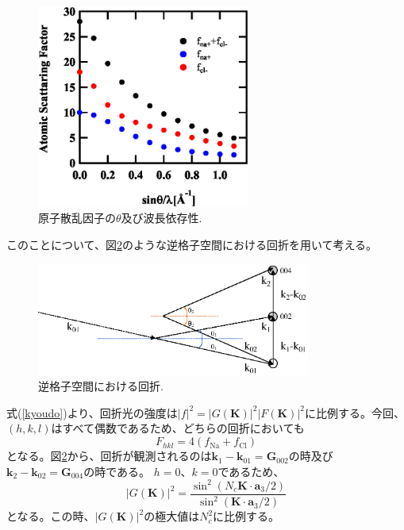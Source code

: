 \documentclass[11pt,a4j,uplatex]{jsarticle}
\begin{document}
\begin{figure}[htb]
 \centering
 \includegraphics[clip,width=7cm]{atomic.eps}
 \caption{原子散乱因子の$\theta$及び波長依存性.}
 \label{atomic}
\end{figure}


 このことについて、図\ref{laue2}のような逆格子空間における回折を用いて考える。
 \begin{figure}[htb]
  \centering
  \includegraphics[clip,width=9cm]{laue2.eps}
  \caption{逆格子空間における回折.}
  \label{laue2}
 \end{figure}

 \newpage
 式(\ref{kyoudo})より、回折光の強度は${|f|}^2={|G\bm{(K)}|^2}{|F\bm{(K)}|^2}$に比例する。今回、$(h,k,l)$はすべて偶数であるため、どちらの回折においても
 \begin{equation}
  F_{hkl}=4(f_{\mathrm{Na}}+f_{\mathrm{Cl}})
 \end{equation}
 となる。図\ref{laue2}から、回折が観測されるのは$\bm{k}_1-\bm{k}_{01}=\bm{G}_{002}$の時及び$\bm{k}_2-\bm{k}_{02}=\bm{G}_{004}$の時である。
 $h=0、k=0$であるため、
 \begin{equation}
  |G(\bm{K})|^2=\frac{\sin^2(N_c\bm{K}\cdot\bm{a}_3/2)}{\sin^2(\bm{K}\cdot\bm{a}_3/2)}
 \end{equation}
 となる。この時、$|G(\bm{K})|^2$の極大値は$N_c^2$に比例する。%
\fi
\end{document}
